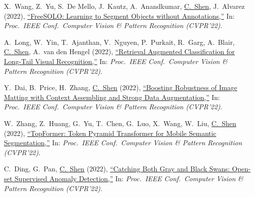 \documentclass[9pt, a4paper]{article}
\newcommand{\years}[1]{\marginnote{\scriptsize #1}}
\def\highlight{\uline}
\begin{document}
\medskip

\years{2022} X.~Wang, Z.~Yu, S.~De Mello, J.~Kautz, A.~Anandkumar, \highlight{C.~Shen}, J.~Alvarez (2022),
\href{http://www.google.com/search?lr=&ie=UTF-8&oe=UTF-8&q=FreeSOLO%3A+Learning+to+Segment+Objects+without+Annotations+Xinlong+Wang%2C+Zhiding+Yu%2C+Shalini+De+Mello%2C+Jan+Kautz%2C+Anima+Anandkumar%2C+Chunhua+Shen%2C+Jose++Alvarez}{``{FreeSOLO}: Learning to Segment Objects without Annotations,{}''}
In: \emph{Proc.\ IEEE Conf.\  Computer Vision \& Pattern Recognition (CVPR'22)}.

\medskip

\years{2022} A.~Long, W.~Yin, T.~Ajanthan, V.~Nguyen, P.~Purkait, R.~Garg, A.~Blair, \highlight{C.~Shen}, A.~van den Hengel (2022),
\href{http://www.google.com/search?lr=&ie=UTF-8&oe=UTF-8&q=Retrieval+Augmented+Classification+for+Long-Tail+Visual+Recognition+Alexander+Long%2C+Wei+Yin%2C+Thalaiyasingam+Ajanthan%2C+Vu+Nguyen%2C+Pulak+Purkait%2C+Ravi+Garg%2C+Alan+Blair%2C+Chunhua+Shen%2C+Anton+van+den+Hengel}{``Retrieval Augmented Classification for Long-Tail Visual Recognition,{}''}
In: \emph{Proc.\ IEEE Conf.\  Computer Vision \& Pattern Recognition (CVPR'22)}.

\medskip

\years{2022} Y.~Dai, B.~Price, H.~Zhang, \highlight{C.~Shen} (2022),
\href{http://www.google.com/search?lr=&ie=UTF-8&oe=UTF-8&q=Boosting+Robustness+of+Image+Matting+with+Context+Assembling+and+Strong+Data+Augmentation+Yutong+Dai%2C+Brian+Price%2C+He+Zhang%2C+Chunhua+Shen}{``Boosting Robustness of Image Matting with Context Assembling and Strong Data Augmentation,{}''}
In: \emph{Proc.\ IEEE Conf.\  Computer Vision \& Pattern Recognition (CVPR'22)}.

\medskip

\years{2022} W.~Zhang, Z.~Huang, G.~Yu, T.~Chen, G.~Luo, X.~Wang, W.~Liu, \highlight{C.~Shen} (2022),
\href{http://www.google.com/search?lr=&ie=UTF-8&oe=UTF-8&q=TopFormer%3A+Token+Pyramid+Transformer+for+Mobile+Semantic+Segmentation+Wenqiang+Zhang%2C+Zilong+Huang%2C+Gang+Yu%2C+Tao+Chen%2C+Guozhong+Luo%2C+Xinggang+Wang%2C+Wenyu+Liu%2C+Chunhua+Shen}{``{TopFormer}: Token Pyramid Transformer for Mobile Semantic Segmentation,{}''}
In: \emph{Proc.\ IEEE Conf.\  Computer Vision \& Pattern Recognition (CVPR'22)}.

\medskip

\years{2022} C.~Ding, G.~Pan, \highlight{C.~Shen} (2022),
\href{http://www.google.com/search?lr=&ie=UTF-8&oe=UTF-8&q=Catching+Both+Gray+and+Black+Swans%3A+Open-set+Supervised+Anomaly+Detection+Choubo+Ding%2C+Guansong+Pan%2C+Chunhua+Shen}{``Catching Both Gray and Black Swans: Open-set Supervised Anomaly Detection,{}''}
In: \emph{Proc.\ IEEE Conf.\  Computer Vision \& Pattern Recognition (CVPR'22)}.
\end{document}
